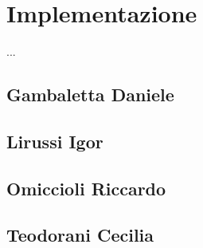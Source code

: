 

\chapter{Implementazione}
...
    \section{Gambaletta Daniele}
    \section{Lirussi Igor}
    \section{Omiccioli Riccardo}
    \section{Teodorani Cecilia}